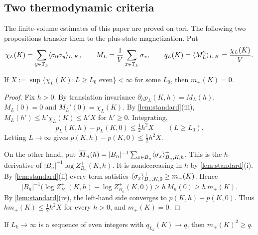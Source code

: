 \subsection{Two thermodynamic criteria}\label{sec:criteria}

The finite-volume estimates of this paper are proved on tori. The following two propositions transfer them to the plus-state magnetization. Put
\[
 \chi_L(K)=\sum_{y\in\mathbb T_L}\langle \sigma_0\sigma_y\rangle_{L,K},\qquad
 M_L=\frac1V\sum_{x\in\mathbb T_L}\sigma_x,\qquad
 q_L(K)=\langle M_L^2\rangle_{L,K}=\frac{\chi_L(K)}{V}.
\]

\begin{proposition}\label{prop:disorder}
If $X:=\sup\{\chi_L(K):L\ge L_0\text{ even}\}<\infty$ for some $L_0$, then $m_+(K)=0$.
\end{proposition}

\begin{proof}
Fix $h>0$. By translation invariance $\partial_hp_L(K,h)=M_L(h)$, $M_L(0)=0$ and $M_L'(0)=\chi_L(K)$. By \cref{lem:standard}(iii), $M_L(h')\le h'\chi_L(K)\le h'X$ for $h'\ge0$. Integrating,
\[
 p_L(K,h)-p_L(K,0)\le\tfrac12h^2X\qquad(L\ge L_0).
\]
Letting $L\to\infty$ gives $p(K,h)-p(K,0)\le\frac12h^2X$.

On the other hand, put $\overline M_n(h)=|B_n|^{-1}\sum_{x\in B_n}\langle \sigma_x\rangle^+_{B_n,K,h}$. This is the $h$-derivative of $|B_n|^{-1}\log Z^+_{B_n}(K,h)$. It is nondecreasing in $h$ by \cref{lem:standard}(i). By \cref{lem:standard}(ii) every term satisfies $\langle \sigma_x\rangle^+_{B_n,K,0}\ge m_+(K)$. Hence
\[
 |B_n|^{-1}\bigl(\log Z^+_{B_n}(K,h)-\log Z^+_{B_n}(K,0)\bigr)\ge h\,\overline M_n(0)\ge h\,m_+(K).
\]
By \cref{lem:standard}(iv), the left-hand side converges to $p(K,h)-p(K,0)$. Thus $hm_+(K)\le\frac12h^2X$ for every $h>0$, and $m_+(K)=0$.
\end{proof}

\begin{proposition}\label{prop:order}
If $L_k\to\infty$ is a sequence of even integers with $q_{L_k}(K)\to q$, then $m_+(K)^2\ge q$.
\end{proposition}

